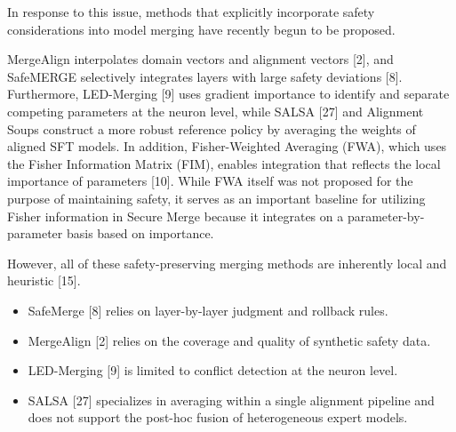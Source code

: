 \documentclass{article}
\begin{document}


In response to this issue, methods that explicitly incorporate safety considerations into model merging have recently begun to be proposed.

MergeAlign interpolates domain vectors and alignment vectors [2], and SafeMERGE selectively integrates layers with large safety deviations [8]. Furthermore, LED-Merging [9] uses gradient importance to identify and separate competing parameters at the neuron level, while SALSA [27] and Alignment Soups construct a more robust reference policy by averaging the weights of aligned SFT models. In addition, Fisher-Weighted Averaging (FWA), which uses the Fisher Information Matrix (FIM), enables integration that reflects the local importance of parameters [10]. While FWA itself was not proposed for the purpose of maintaining safety, it serves as an important baseline for utilizing Fisher information in Secure Merge because it integrates on a parameter-by-parameter basis based on importance.

However, all of these safety-preserving merging methods are inherently local and heuristic [15].
\begin{itemize}
\item SafeMerge [8] relies on layer-by-layer judgment and rollback rules.
\item MergeAlign [2] relies on the coverage and quality of synthetic safety data.
\item LED-Merging [9] is limited to conflict detection at the neuron level.
\item SALSA [27] specializes in averaging within a single alignment pipeline and does not support the post-hoc fusion of heterogeneous expert models.
\end{itemize}
\end{document}
